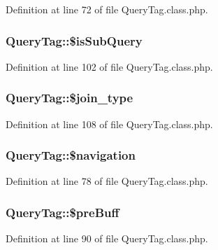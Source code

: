 Definition at line 72 of file Query\-Tag.\-class.\-php.

\hypertarget{classQueryTag_ac657cdbbef0ca8f1907197cbf91f1040}{
\subsubsection[{\$is\-Sub\-Query}]{\setlength{\rightskip}{0pt plus 5cm}Query\-Tag\-::\$is\-Sub\-Query}}\label{classQueryTag_ac657cdbbef0ca8f1907197cbf91f1040}


Definition at line 102 of file Query\-Tag.\-class.\-php.

\hypertarget{classQueryTag_a8ab11b51470b725b766e2d53bb947ba4}{
\subsubsection[{\$join\-\_\-type}]{\setlength{\rightskip}{0pt plus 5cm}Query\-Tag\-::\$join\-\_\-type}}\label{classQueryTag_a8ab11b51470b725b766e2d53bb947ba4}


Definition at line 108 of file Query\-Tag.\-class.\-php.

\hypertarget{classQueryTag_a60f53db40ea035c8e9c88ab2681e3792}{
\subsubsection[{\$navigation}]{\setlength{\rightskip}{0pt plus 5cm}Query\-Tag\-::\$navigation}}\label{classQueryTag_a60f53db40ea035c8e9c88ab2681e3792}


Definition at line 78 of file Query\-Tag.\-class.\-php.

\hypertarget{classQueryTag_ac51df39445e0b132d1fa388c01ebf56d}{
\subsubsection[{\$pre\-Buff}]{\setlength{\rightskip}{0pt plus 5cm}Query\-Tag\-::\$pre\-Buff}}\label{classQueryTag_ac51df39445e0b132d1fa388c01ebf56d}


Definition at line 90 of file Query\-Tag.\-class.\-php.

